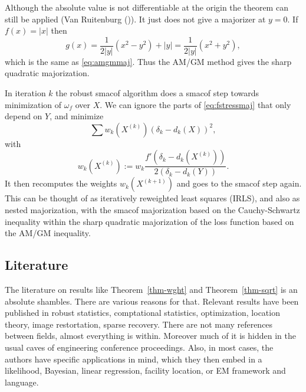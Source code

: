 \documentclass[
  12pt,
  letterpaper,
  DIV=11,
  numbers=noendperiod]{scrartcl}
\theoremstyle{plain}
\theoremstyle{remark}
\begin{document}
Although the absolute value is not differentiable at the origin the
theorem can still be applied (Van Ruitenburg
()). It just does not give a
majorizer at \(y=0\). If \(f(x)=|x|\) then \begin{equation}
g(x)=\frac{1}{2|y|}(x^2-y^2)+|y|=\frac{1}{2|y|}(x^2+y^2),\label{eq:abssharp}
\end{equation} which is the same as \eqref{eq:amgmmaj}. Thus the AM/GM
method gives the sharp quadratic majorization.

In iteration \(k\) the robust smacof algorithm does a smacof step
towards minimization of \(\omega_f\) over \(X\). We can ignore the parts
of \eqref{eq:fstressmaj} that only depend on \(Y\), and minimize
\begin{equation}
\sum w_k(X^{(k)})(\delta_k-d_k(X))^2,\label{eq:fstressaux}
\end{equation} with \begin{equation}
w_k(X^{(k)}):=w_k\frac{f'(\delta_k-d_k(X^{(k)}))}{2(\delta_k-d_k(Y))}.\label{eq:wkdef}
\end{equation} It then recomputes the weights \(w_k(X^{(k+1)})\) and
goes to the smacof step again. This can be thought of as iteratively
reweighted least squares (IRLS), and also as nested majorization, with
the smacof majorization based on the Cauchy-Schwartz inequality within
the sharp quadratic majorization of the loss function based on the AM/GM
inequality.

\subsection{Literature}\label{literature}

The literature on results like Theorem~\ref{thm-wght} and
Theorem~\ref{thm-sqrt} is an absolute shambles. There are various
reasons for that. Relevant results have been published in robust
statistics, comptational statistics, optimization, location theory,
image restortation, sparse recovery. There are not many references
between fields, almost everything is within. Moreover much of it is
hidden in the usual caves of engineering conference proceedings. Also,
in most cases, the authors have specific applications in mind, which
they then embed in a likelihood, Bayesian, linear regression, facility
location, or EM framework and language.
\end{document}
